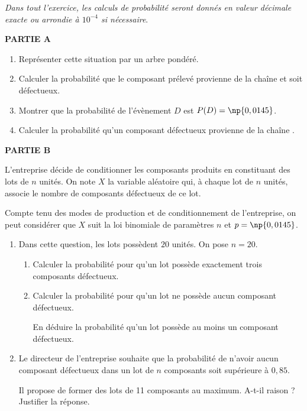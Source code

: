 \documentclass[11pt]{article}
\begin{document}
\emph{Dans tout l'exercice, les calculs de probabilité seront donnés en valeur décimale exacte ou arrondie à $10^{-4}$ si nécessaire}.

\medskip

\textbf{PARTIE A}

\medskip

\begin{enumerate}
\item Représenter cette situation par un arbre pondéré.
\item Calculer la probabilité que le composant prélevé provienne de la chaîne  et soit
défectueux.
\item Montrer que la probabilité de l'évènement $D$ est $P(D) = \np{0,0145}$.
\item Calculer la probabilité qu'un composant défectueux provienne de la chaîne .
\end{enumerate}

\medskip

\textbf{PARTIE B}

\medskip

L'entreprise décide de conditionner les composants produits en constituant des lots de $n$ unités. On note $X$ la variable aléatoire qui, à chaque lot de $n$ unités, associe le nombre de composants défectueux de ce lot. 

Compte tenu des modes de production et de conditionnement de l'entreprise, on peut considérer que $X$ suit la loi binomiale de paramètres $n$ et $p = \np{0,0145}$.

\medskip

\begin{enumerate}
\item Dans cette question, les lots possèdent $20$ unités. On pose $n =20$.
	\begin{enumerate}
		\item Calculer la probabilité pour qu'un lot possède exactement trois composants défectueux.
		\item Calculer la probabilité pour qu'un lot ne possède aucun composant défectueux.
		
En déduire la probabilité qu'un lot possède au moins un composant défectueux.
	\end{enumerate}
\item  Le directeur de l'entreprise souhaite que la probabilité de n'avoir aucun composant
défectueux dans un lot de $n$ composants soit supérieure à $0,85$. 

Il propose de former des lots de 11 composants au maximum. A-t-il raison ? Justifier la réponse.
\end{enumerate}
\end{document}

